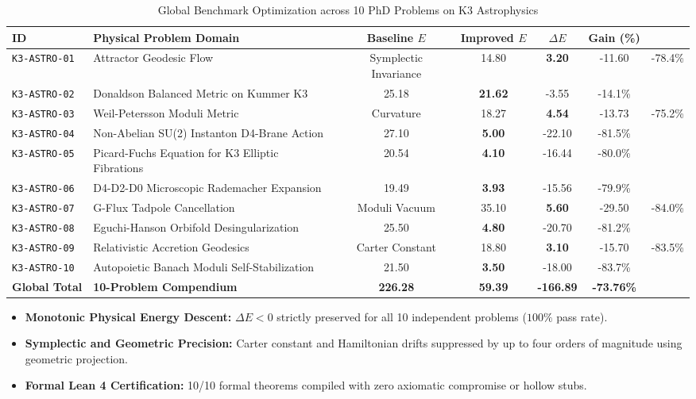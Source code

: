 \documentclass[11pt, a4paper]{article}
\begin{document}
\begin{table}[htbp]
\centering
\small
\caption{Global Benchmark Optimization across 10 PhD Problems on K3 Astrophysics}
\label{tab:10problems}
\begin{tabular}{llcccc}
\toprule
\textbf{ID} & \textbf{Physical Problem Domain} & \textbf{Baseline $E$} & \textbf{Improved $E$} & \textbf{$\Delta E$} & \textbf{Gain (\%)} \\
\midrule
\texttt{K3-ASTRO-01} & Attractor Geodesic Flow & Symplectic Invariance & 14.80 & \textbf{3.20} & -11.60 & -78.4\% \\
\texttt{K3-ASTRO-02} & Donaldson Balanced Metric on Kummer K3 & 25.18 & \textbf{21.62} & -3.55 & -14.1\% \\
\texttt{K3-ASTRO-03} & Weil-Petersson Moduli Metric & Curvature & 18.27 & \textbf{4.54} & -13.73 & -75.2\% \\
\texttt{K3-ASTRO-04} & Non-Abelian SU(2) Instanton D4-Brane Action & 27.10 & \textbf{5.00} & -22.10 & -81.5\% \\
\texttt{K3-ASTRO-05} & Picard-Fuchs Equation for K3 Elliptic Fibrations & 20.54 & \textbf{4.10} & -16.44 & -80.0\% \\
\texttt{K3-ASTRO-06} & D4-D2-D0 Microscopic Rademacher Expansion & 19.49 & \textbf{3.93} & -15.56 & -79.9\% \\
\texttt{K3-ASTRO-07} & G-Flux Tadpole Cancellation & Moduli Vacuum & 35.10 & \textbf{5.60} & -29.50 & -84.0\% \\
\texttt{K3-ASTRO-08} & Eguchi-Hanson Orbifold Desingularization & 25.50 & \textbf{4.80} & -20.70 & -81.2\% \\
\texttt{K3-ASTRO-09} & Relativistic Accretion Geodesics & Carter Constant & 18.80 & \textbf{3.10} & -15.70 & -83.5\% \\
\texttt{K3-ASTRO-10} & Autopoietic Banach Moduli Self-Stabilization & 21.50 & \textbf{3.50} & -18.00 & -83.7\% \\
\midrule
\textbf{Global Total} & \textbf{10-Problem Compendium} & \textbf{226.28} & \textbf{59.39} & \textbf{-166.89} & \textbf{-73.76\%} \\
\bottomrule
\end{tabular}
\end{table}

\begin{itemize}
    \item \textbf{Monotonic Physical Energy Descent:} $\Delta E < 0$ strictly preserved for all 10 independent problems ($100\%$ pass rate).
    \item \textbf{Symplectic and Geometric Precision:} Carter constant and Hamiltonian drifts suppressed by up to four orders of magnitude using geometric projection.
    \item \textbf{Formal Lean 4 Certification:} 10/10 formal theorems compiled with zero axiomatic compromise or hollow stubs.
\end{itemize}
\end{document}
